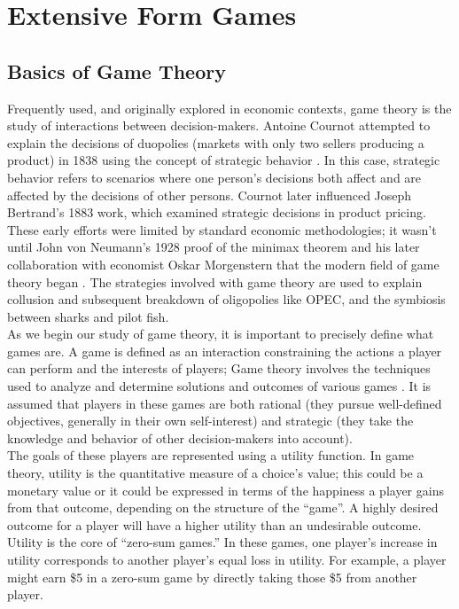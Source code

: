 \chapter{Extensive Form Games}
\section{Basics of Game Theory}
Frequently used, and originally explored in economic contexts, game theory is the study of interactions between decision-makers. Antoine Cournot attempted to explain the decisions of duopolies (markets with only two sellers producing a product) in 1838 using the concept of strategic behavior \cite{webs14}. In this case, strategic behavior refers to scenarios where one person's decisions both affect and are affected by the decisions of other persons. Cournot later influenced Joseph Bertrand's 1883 work, which examined strategic decisions in product pricing. These early efforts were limited by standard economic methodologies; it wasn't until John von Neumann's 1928 proof of the minimax theorem and his later collaboration with economist Oskar Morgenstern that the modern field of game theory began \cite{webs14}. The strategies involved with game theory are used to explain collusion and subsequent breakdown of oligopolies like OPEC, and the symbiosis between sharks and pilot fish.\\

As we begin our study of game theory, it is important to precisely define what games are. A game is defined as an interaction constraining the actions a player can perform and the interests of players; Game theory involves the techniques used to analyze and determine solutions and outcomes of various games \cite{osbo94}. It is assumed that players in these games are both rational (they pursue well-defined objectives, generally in their own self-interest) and strategic (they take the knowledge and behavior of other decision-makers into account)\cite{osbo94}.\\

The goals of these players are represented using a utility function. In game theory, utility is the quantitative measure of a choice's value; this could be a monetary value or it could be expressed in terms of the happiness a player gains from that outcome, depending on the structure of the ``game''. A highly desired outcome for a player will have a higher utility than an undesirable outcome. Utility is the core of ``zero-sum games.'' In these games, one player's increase in utility corresponds to another player's equal loss in utility. For example, a player might earn \$5 in a zero-sum game by directly taking those \$5 from another player.

